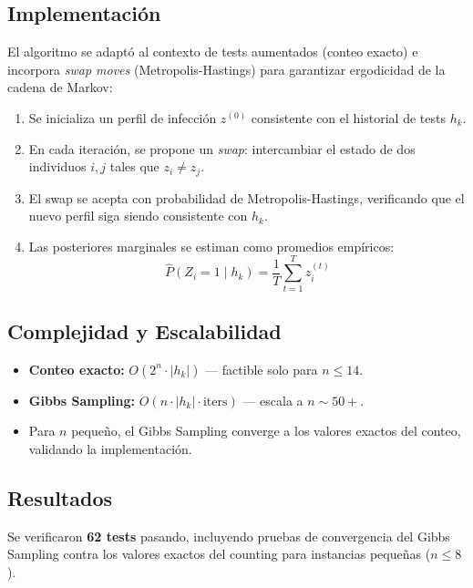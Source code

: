 \documentclass[11pt, a4paper]{article}
\begin{document}
\subsection{Implementaci\'on}
El algoritmo se adapt\'o al contexto de tests aumentados (conteo exacto)
e incorpora \textit{swap moves} (Metropolis-Hastings) para garantizar
ergodicidad de la cadena de Markov:

\begin{enumerate}[nosep]
    \item Se inicializa un perfil de infecci\'on $z^{(0)}$ consistente con
    el historial de tests $h_k$.
    \item En cada iteraci\'on, se propone un \textit{swap}: intercambiar el
    estado de dos individuos $i, j$ tales que $z_i \neq z_j$.
    \item El swap se acepta con probabilidad de Metropolis-Hastings,
    verificando que el nuevo perfil siga siendo consistente con $h_k$.
    \item Las posteriores marginales se estiman como promedios emp\'iricos:
    \begin{equation}
        \hat{P}(Z_i = 1 \mid h_k) = \frac{1}{T} \sum_{t=1}^{T} z_i^{(t)}
    \end{equation}
\end{enumerate}

\subsection{Complejidad y Escalabilidad}
\begin{itemize}[nosep]
    \item \textbf{Conteo exacto:} $O(2^n \cdot |h_k|)$ --- factible solo para $n \leq 14$.
    \item \textbf{Gibbs Sampling:} $O(n \cdot |h_k| \cdot \text{iters})$ --- escala a $n \sim 50+$.
    \item Para $n$ peque\~no, el Gibbs Sampling converge a los valores exactos
    del conteo, validando la implementaci\'on.
\end{itemize}

\subsection{Resultados}
Se verificaron \textbf{62 tests} pasando, incluyendo pruebas de convergencia
del Gibbs Sampling contra los valores exactos del counting para instancias
peque\~nas ($n \leq 8$).

\end{document}
